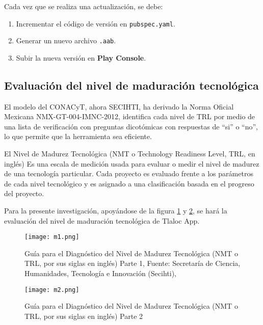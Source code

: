Cada vez que se realiza una actualización, se debe:

\begin{enumerate}
    \item Incrementar el código de versión en \texttt{pubspec.yaml}.
    \item Generar un nuevo archivo \texttt{.aab}.
    \item Subir la nueva versión en \textbf{Play Console}.
\end{enumerate}











\newpage
\subsection{Evaluación del nivel de maduración tecnológica}

El modelo del CONACyT, ahora SECIHTI, ha derivado la Norma Oficial Mexicana NMX-GT-004-IMNC-2012, identifica cada nivel de TRL por medio de una lista de verificación con preguntas dicotómicas con respuestas de ``si'' o ``no'', lo que permite que la herramienta sea eficiente.


El Nivel de Madurez Tecnológica (NMT o Technology Readiness Level, TRL, en inglés) 
Es una escala de medición usada para evaluar o medir el nivel de madurez de una
tecnología particular. Cada proyecto es evaluado frente a los parámetros de cada
nivel tecnológico y es asignado a una clasificación basada en el progreso del
proyecto.

Para la presente investigación, apoyándose de la figura \ref{m1} y \ref{m2}, se hará la evaluación del nivel de maduración tecnológica de Tlaloc App.

\begin{figure}[h!]
\centering
  \texttt{[image: m1.png]}
  \caption{Guía para el Diagnóstico del Nivel de Madurez Tecnológica (NMT o TRL, por sus siglas en inglés) Parte 1, Fuente: Secretaría de Ciencia, Humanidades, Tecnología e Innovación (Secihti),}
  \label{m1}
\end{figure}
\begin{figure}[h!]
\centering
  \texttt{[image: m2.png]}
  \caption{Guía para el Diagnóstico del Nivel de Madurez Tecnológica (NMT o TRL, por sus siglas en inglés) Parte 2}
  \label{m2}
\end{figure}


